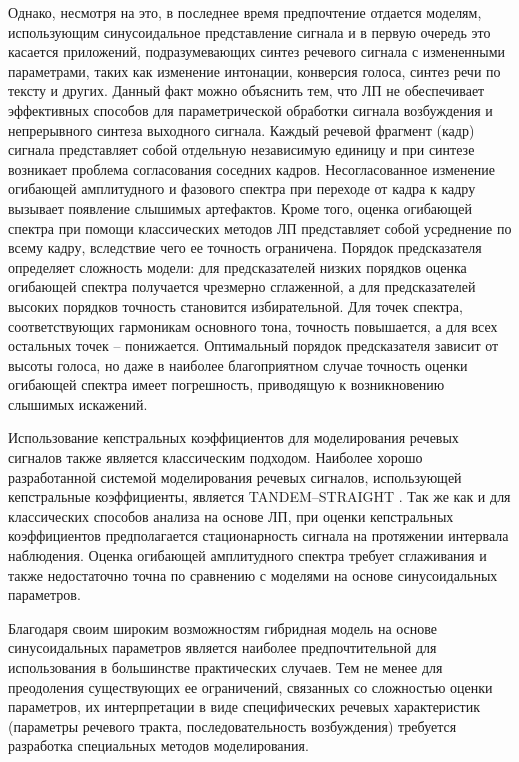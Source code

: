 Однако, несмотря на это, в последнее время предпочтение отдается моделям, использующим синусоидальное представление сигнала и в первую очередь это касается приложений, подразумевающих синтез речевого сигнала с измененными параметрами, таких как изменение интонации, конверсия голоса, синтез речи по тексту и других. Данный факт можно объяснить тем, что ЛП не обеспечивает эффективных способов для параметрической обработки сигнала возбуждения и непрерывного синтеза выходного сигнала. Каждый речевой фрагмент (кадр) сигнала представляет собой отдельную независимую единицу и при синтезе возникает проблема согласования соседних кадров. Несогласованное изменение огибающей амплитудного и фазового спектра при переходе от кадра к кадру вызывает появление слышимых артефактов. Кроме того, оценка огибающей спектра при помощи классических методов ЛП представляет собой усреднение по всему кадру, вследствие чего ее точность ограничена. Порядок предсказателя определяет сложность модели: для предсказателей низких порядков оценка огибающей спектра получается чрезмерно сглаженной, а для предсказателей высоких порядков точность становится избирательной. Для точек спектра, соответствующих гармоникам основного тона, точность повышается, а для всех остальных точек – понижается. Оптимальный порядок предсказателя зависит от высоты голоса, но даже в наиболее благоприятном случае точность оценки огибающей спектра имеет погрешность, приводящую к возникновению слышимых искажений.

Использование кепстральных коэффициентов для моделирования речевых сигналов также является классическим подходом. Наиболее хорошо разработанной системой моделирования речевых сигналов, использующей кепстральные коэффициенты, является TANDEM–STRAIGHT . Так же как и для классических способов анализа на основе ЛП, при оценки кепстральных коэффициентов предполагается стационарность сигнала на протяжении интервала наблюдения. Оценка огибающей амплитудного спектра требует сглаживания и также недостаточно точна по сравнению с моделями на основе синусоидальных параметров.

Благодаря своим широким возможностям гибридная модель на основе синусоидальных параметров является наиболее предпочтительной для использования в большинстве практических случаев. Тем не менее для преодоления существующих ее ограничений, связанных со сложностью оценки параметров, их интерпретации в виде специфических речевых характеристик (параметры речевого тракта, последовательность возбуждения) требуется разработка специальных методов моделирования. 

